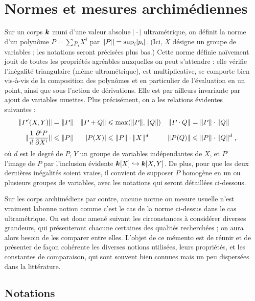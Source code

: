 
\chapter{Normes et mesures archimédiennes} \label{chap:nma}

Sur un corps ${\boldsymbol k}$ muni d'une valeur absolue $\lvert{\,\cdot\,}\rvert$ ultramétrique, on
définit la norme d'un polynôme $P = \sum p_i X^i$ par $\lVert P\rVert = \sup_i
\lvert p_i\rvert$. (Ici, $X$ désigne un groupe de variables ; les notations seront
précisées plus bas.) Cette norme définie naïvement jouit de toutes les
propriétés agréables auxquelles on peut s'attendre : elle vérifie l'inégalité
triangulaire (même ultramétrique), est multiplicative, se comporte bien
vis-à-vis de la composition des polynômes et en particulier de l'évaluation
en un point, ainsi que sous l'action de dérivations. Elle est par ailleurs
invariante par ajout de variables muettes. Plus précisément, on a les
relations évidentes suivantes :
\begin{align*}
  \lVert P'(X, Y)\rVert
  & = \lVert P\rVert
  &
  \lVert P+Q\rVert
  & \leqslant \max (\lVert P\rVert, \lVert Q\rVert)
  &
  \lVert P\cdot Q\rVert
  & = \lVert P\rVert \cdot \lVert Q\rVert
  \\
  \lVert \frac{1}{i!} \frac {\partial^i P} {\partial X^i} \rVert
  & \leqslant \lVert P\rVert
  &
  \lvert P(X)\rvert
  & \leqslant \lVert P\rVert \cdot \lVert X\rVert^d
  &
  \lVert P(Q)\rVert
  & \leqslant \lVert P\rVert \cdot \lVert Q\rVert^d
  \text{ ,}
\end{align*}
où $d$ est le degré de $P$, $Y$ un groupe de variables indépendantes de $X$,
et $P'$ l'image de $P$ par l'inclusion évidente ${\boldsymbol k}[X] \hookrightarrow
{\boldsymbol k}[X, Y]$. De plus, pour que les deux dernières inégalités soient vraies, il
convient de supposer $P$ homogène en un ou plusieurs groupes de variables,
avec les notations qui seront détaillées ci-dessous.

Sur les corps archimédiens par contre, aucune norme ou mesure usuelle n'est
vraiment \og la\fg bonne notion comme c'est le cas de la norme ci-dessus dans
le cas ultramétrique. On est donc amené suivant les circonstances à considérer
diverses grandeurs, qui présenteront chacune certaines des qualités
recherchées ; on aura alors besoin de les comparer entre elles. L'objet de ce
mémento est de réunir et de présenter de façon cohérente les diverses notions
utilisées, leurs propriétés, et les constantes de comparaison, qui sont
souvent bien connues mais un peu dispersées dans la littérature.


\section{Notations} \label{sec:nma-def}

